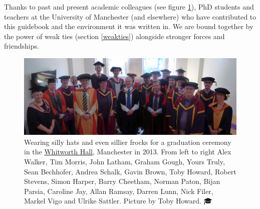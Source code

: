 \documentclass[
]{book}
\begin{document}
Thanks to past and present academic colleagues (see figure \ref{fig:academics-fig}), PhD students and teachers at the University of Manchester (and elsewhere) who have contributed to this guidebook and the environment it was written in. We are bound together by the power of weak ties (section \ref{weakties}) alongside stronger forces and friendships.

\begin{figure}

{\centering \includegraphics[width=1\linewidth]{images/graduation-ceremony-2013} 

}

\caption{Wearing silly hats and even sillier frocks for a graduation ceremony in the \href{https://en.wikipedia.org/wiki/Whitworth_Hall}{Whitworth Hall}, Manchester in 2013. From left to right Alex Walker, Tim Morris, John Latham, Graham Gough, Yours Truly, Sean Bechhofer, Andrea Schalk, Gavin Brown, Toby Howard, Robert Stevens, Simon Harper, Barry Cheetham, Norman Paton, Bijan Parsia, Caroline Jay, Allan Ramsay, Darren Lunn, Nick Filer, Markel Vigo and Ulrike Sattler. Picture by Toby Howard. 🎓}\label{fig:academics-fig}
\end{figure}
\end{document}
